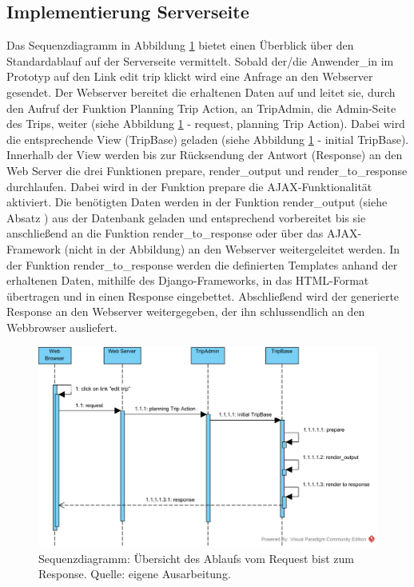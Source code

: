 \documentclass[Bachelorarbeit.tex]{subfiles}
\begin{document}
\subsection{Implementierung Serverseite}
\label{implServer}


Das Sequenzdiagramm in Abbildung \ref{fig:Overview} bietet einen Überblick über den Standardablauf auf der Serverseite vermittelt. 
Sobald der/die Anwender\_in im  Prototyp auf den Link edit trip klickt wird eine  Anfrage an den Webserver gesendet.
Der Webserver bereitet die erhaltenen Daten auf und leitet sie, durch den Aufruf der Funktion Planning Trip Action, an TripAdmin, die Admin-Seite des Trips, weiter (siehe Abbildung \ref{fig:Overview} - request, planning Trip Action). 
Dabei wird die entsprechende View (TripBase) geladen (siehe Abbildung \ref{fig:Overview} - initial TripBase).
Innerhalb der View werden bis zur Rücksendung der Antwort (Response) an den Web Server die drei Funktionen prepare, render\_output und render\_to\_response durchlaufen. 
Dabei wird in der Funktion prepare die \ac{AJAX}-Funktionalität aktiviert.
Die benötigten Daten werden in der Funktion render\_output (siehe Absatz ) aus der Datenbank geladen und entsprechend vorbereitet bis sie anschließend an die Funktion render\_to\_response oder über das \ac{AJAX}-Framework (nicht in der Abbildung) an den Webserver weitergeleitet werden.
In der Funktion render\_to\_response werden die definierten Templates anhand der erhaltenen Daten, mithilfe des Django-Frameworks, in das \ac{HTML}-Format übertragen und in einen Response eingebettet.
Abschließend wird der generierte Response an den Webserver weitergegeben, der ihn schlussendlich an den Webbrowser ausliefert.


\begin{figure}[h]
\centering
\includegraphics[width=1\linewidth]{img/Implementierung/Overview}
\caption[k]{Sequenzdiagramm: Übersicht des Ablaufs vom Request bist zum Response. Quelle: eigene Ausarbeitung.}
\label{fig:Overview}
\end{figure}
\end{document}
